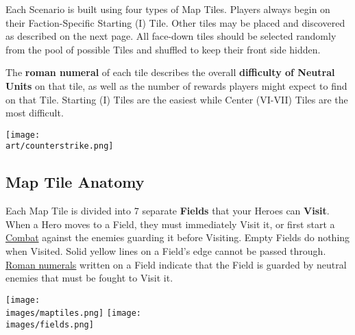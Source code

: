 
\begin{multicols*}{2}
Each Scenario is built using four types of Map Tiles.
Players always begin on their Faction-Specific Starting (I) Tile.
Other tiles may be placed and discovered as described on the next page.
All face-down tiles should be selected randomly from the pool of possible Tiles and shuffled to keep their front side hidden.\par
The \textbf{roman numeral} of each tile describes the overall \textbf{difficulty of Neutral Units} on that tile, as well as the number of rewards players might expect to find on that Tile.
Starting (I) Tiles are the easiest while Center (VI-VII) Tiles are the most difficult.\par

\vfill
\begin{center}
  \texttt{[image: \\art/counterstrike.png]}
\end{center}
\vfill

\subsection*{Map Tile Anatomy}
Each Map Tile is divided into 7 separate \textbf{Fields} that your Heroes can \textbf{Visit}.
When a Hero moves to a Field, they must immediately Visit it, or
first start a \hyperlink{Combat}{Combat} against the enemies guarding it before Visiting.
Empty Fields do nothing when Visited.
Solid yellow lines on a Field's edge cannot be passed through.
\hyperlink{Difficulty}{Roman numerals} written on a Field indicate that the Field is guarded by neutral enemies that must be fought to Visit it.\par
\columnbreak
\texttt{[image: \\images/maptiles.png]}
\vfill
\texttt{[image: \\images/fields.png]}
\end{multicols*}

\clearpage

